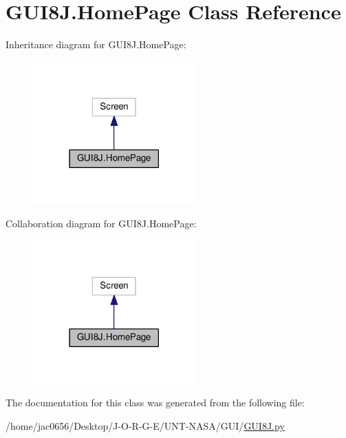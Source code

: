 \hypertarget{classGUI8J_1_1HomePage}{}\section{G\+U\+I8\+J.\+Home\+Page Class Reference}
\label{classGUI8J_1_1HomePage}


Inheritance diagram for G\+U\+I8\+J.\+Home\+Page\+:
\nopagebreak
\begin{figure}[H]
\begin{center}
\leavevmode
\includegraphics[width=177pt]{classGUI8J_1_1HomePage__inherit__graph}
\end{center}
\end{figure}


Collaboration diagram for G\+U\+I8\+J.\+Home\+Page\+:
\nopagebreak
\begin{figure}[H]
\begin{center}
\leavevmode
\includegraphics[width=177pt]{classGUI8J_1_1HomePage__coll__graph}
\end{center}
\end{figure}


The documentation for this class was generated from the following file\+:\begin{DoxyCompactItemize}
\item 
/home/jac0656/\+Desktop/\+J-\/\+O-\/\+R-\/\+G-\/\+E/\+U\+N\+T-\/\+N\+A\+S\+A/\+G\+U\+I/\hyperlink{GUI8J_8py}{G\+U\+I8\+J.\+py}\end{DoxyCompactItemize}
